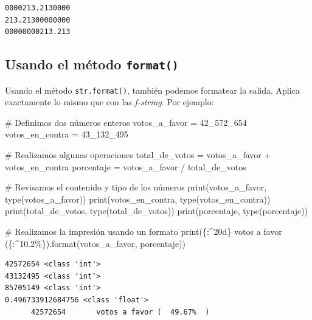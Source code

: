 \documentclass[
  spanish,
  letterpaper,
]{scrbook}
\newenvironment{Shaded}{\begin{snugshade}}{\end{snugshade}}
\newcommand{\BuiltInTok}[1]{\textcolor[rgb]{0.00,0.23,0.31}{#1}}
\newcommand{\CommentTok}[1]{\textcolor[rgb]{0.37,0.37,0.37}{#1}}
\newcommand{\DecValTok}[1]{\textcolor[rgb]{0.68,0.00,0.00}{#1}}
\newcommand{\NormalTok}[1]{\textcolor[rgb]{0.00,0.23,0.31}{#1}}
\newcommand{\OperatorTok}[1]{\textcolor[rgb]{0.37,0.37,0.37}{#1}}
\newcommand{\SpecialCharTok}[1]{\textcolor[rgb]{0.37,0.37,0.37}{#1}}
\newcommand{\StringTok}[1]{\textcolor[rgb]{0.13,0.47,0.30}{#1}}
\theoremstyle{definition}
\theoremstyle{remark}
\begin{document}
\begin{verbatim}
0000213.2130000
213.21300000000
00000000213.213
\end{verbatim}

\subsection{\texorpdfstring{Usando el método
\texttt{format()}}{Usando el método format()}}\label{usando-el-muxe9todo-format}

Usando el método \texttt{str.format()}, también podemos formatear la
salida. Aplica exactamente lo mismo que con las \emph{f-string}. Por
ejemplo:

\begin{Shaded}
\begin{Highlighting}[]
\CommentTok{\# Definimos dos números enteros}
\NormalTok{votos\_a\_favor }\OperatorTok{=} \DecValTok{42\_572\_654}   
\NormalTok{votos\_en\_contra }\OperatorTok{=} \DecValTok{43\_132\_495} 

\CommentTok{\# Realizamos algunas operaciones}
\NormalTok{total\_de\_votos }\OperatorTok{=}\NormalTok{ votos\_a\_favor }\OperatorTok{+}\NormalTok{ votos\_en\_contra}
\NormalTok{porcentaje }\OperatorTok{=}\NormalTok{ votos\_a\_favor }\OperatorTok{/}\NormalTok{ total\_de\_votos}

\CommentTok{\# Revisamos el contenido y tipo de los números}
\BuiltInTok{print}\NormalTok{(votos\_a\_favor, }\BuiltInTok{type}\NormalTok{(votos\_a\_favor))}
\BuiltInTok{print}\NormalTok{(votos\_en\_contra, }\BuiltInTok{type}\NormalTok{(votos\_en\_contra))}
\BuiltInTok{print}\NormalTok{(total\_de\_votos, }\BuiltInTok{type}\NormalTok{(total\_de\_votos))}
\BuiltInTok{print}\NormalTok{(porcentaje, }\BuiltInTok{type}\NormalTok{(porcentaje))}

\CommentTok{\# Realizamos la impresión usando un formato}
\BuiltInTok{print}\NormalTok{(}\StringTok{\textquotesingle{}}\SpecialCharTok{\{:\^{}20d\}}\StringTok{ votos a favor (}\SpecialCharTok{\{:\^{}10.2\%\}}\StringTok{)\textquotesingle{}}\NormalTok{.}\BuiltInTok{format}\NormalTok{(votos\_a\_favor, porcentaje))}
\end{Highlighting}
\end{Shaded}

\begin{verbatim}
42572654 <class 'int'>
43132495 <class 'int'>
85705149 <class 'int'>
0.496733912684756 <class 'float'>
      42572654       votos a favor (  49.67%  )
\end{verbatim}
\end{document}
